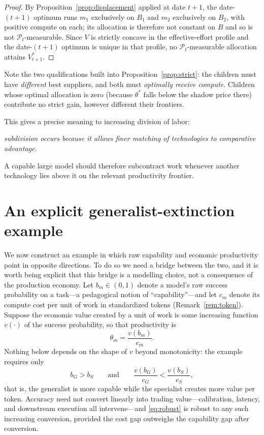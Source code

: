 \documentclass[11pt]{article}
\theoremstyle{definition}
\theoremstyle{remark}
\begin{document}
\begin{proof}
By Proposition~\ref{prop:displacement} applied at date $t{+}1$, the date-$(t{+}1)$ optimum runs $m_1$ exclusively on $B_1$ and $m_2$ exclusively on $B_2$, with positive compute on each; its allocation is therefore not constant on $B$ and so is not $\mathcal{P}_t$-measurable. Since $V$ is strictly concave in the effective-effort profile and the date-$(t{+}1)$ optimum is unique in that profile, no $\mathcal{P}_t$-measurable allocation attains $V^*_{t+1}$.
\end{proof}

Note the two qualifications built into Proposition~\ref{prop:strict}: the children must have \emph{different} best suppliers, and both must \emph{optimally receive compute}. Children whose optimal allocation is zero (because $\theta^*$ falls below the shadow price there) contribute no strict gain, however different their frontiers.

This gives a precise meaning to increasing division of labor:
\begin{center}
\emph{subdivision occurs because it allows finer matching of technologies to comparative advantage.}
\end{center}
A capable large model should therefore subcontract work whenever another technology lies above it on the relevant productivity frontier.

\section{An explicit generalist-extinction example}
\label{sec:extinction}

We now construct an example in which raw capability and economic productivity point in opposite directions. To do so we need a bridge between the two, and it is worth being explicit that this bridge is a modelling choice, not a consequence of the production economy. Let $b_m \in (0,1)$ denote a model's raw success probability on a task---a pedagogical notion of ``capability''---and let $c_m$ denote its compute cost per unit of work in standardized tokens (Remark~\ref{rem:token}). Suppose the economic value created by a unit of work is some increasing function $v(\cdot)$ of the success probability, so that productivity is
\begin{equation}
\label{eq:bridge}
\theta_m = \frac{v(b_m)}{c_m}.
\end{equation}
Nothing below depends on the shape of $v$ beyond monotonicity: the example requires only
\begin{equation}
\label{eq:robust}
b_G > b_S
\qquad\text{and}\qquad
\frac{v(b_G)}{c_G} < \frac{v(b_S)}{c_S},
\end{equation}
that is, the generalist is more capable while the specialist creates more value per token. Accuracy need not convert linearly into trading value---calibration, latency, and downstream execution all intervene---and \eqref{eq:robust} is robust to any such increasing conversion, provided the cost gap outweighs the capability gap after conversion.
\end{document}
